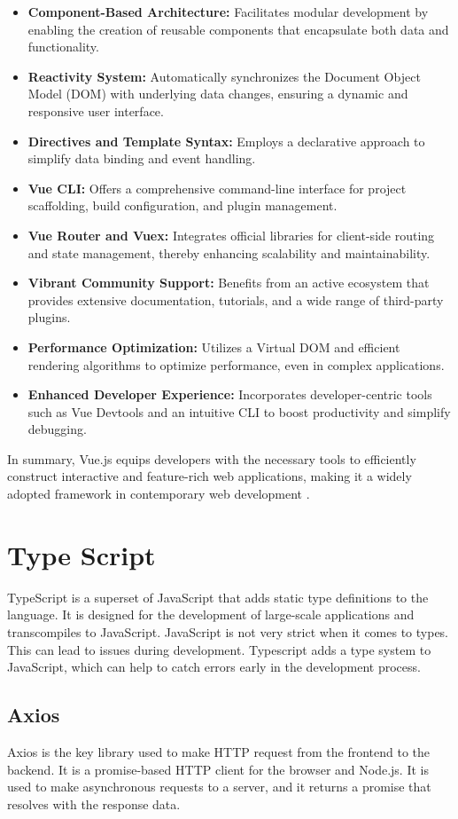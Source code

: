 \begin{itemize}
    \item \textbf{Component-Based Architecture:} Facilitates modular development by enabling the creation of reusable components that encapsulate both data and functionality.
    \item \textbf{Reactivity System:} Automatically synchronizes the Document Object Model (DOM) with underlying data changes, ensuring a dynamic and responsive user interface.
    \item \textbf{Directives and Template Syntax:} Employs a declarative approach to simplify data binding and event handling.
    \item \textbf{Vue CLI:} Offers a comprehensive command-line interface for project scaffolding, build configuration, and plugin management.
    \item \textbf{Vue Router and Vuex:} Integrates official libraries for client-side routing and state management, thereby enhancing scalability and maintainability.
    \item \textbf{Vibrant Community Support:} Benefits from an active ecosystem that provides extensive documentation, tutorials, and a wide range of third-party plugins.
    \item \textbf{Performance Optimization:} Utilizes a Virtual DOM and efficient rendering algorithms to optimize performance, even in complex applications.
    \item \textbf{Enhanced Developer Experience:} Incorporates developer-centric tools such as Vue Devtools and an intuitive CLI to boost productivity and simplify debugging.
\end{itemize}

In summary, Vue.js equips developers with the necessary tools to efficiently construct interactive and feature-rich web applications, making it a widely adopted framework in contemporary web development 
\cite{VueJS-introduction}.

\section{Type Script}
\label{sec:TypeScript}

TypeScript is a superset of JavaScript that adds static type definitions to the language. It is designed for the development of large-scale applications and transcompiles to JavaScript.
JavaScript is not very strict when it comes to types. This can lead to issues during development. Typescript adds a type system to JavaScript, which can help to catch errors early in the development process. 
\cite{Typescript_w3}

\subsection{Axios}
Axios is the key library used to make HTTP request from the frontend to the backend. It is a promise-based HTTP client for the browser and Node.js. It is used to make asynchronous requests to a server, and it returns a promise that resolves with the response data. 
\cite{axios_docs}

